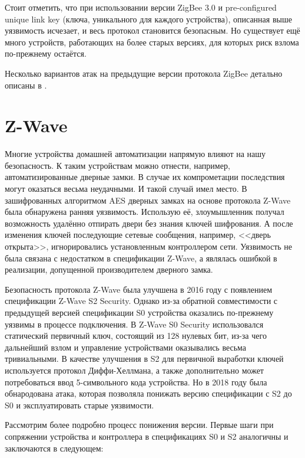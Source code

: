 	Стоит отметить, что при использовании версии ZigBee 3.0 и pre-configured unique link key (ключа,
	уникального для каждого устройства), описанная выше уязвимость исчезает, и весь протокол
	становится безопасным. Но существует ещё много устройств, работающих на более старых версиях,
	для которых риск взлома по-прежнему остаётся.
	
	Несколько вариантов атак на предыдущие версии протокола ZigBee детально описаны в 
	\cite{zigbee-attacks}.


	\section{Z-Wave}
	
	
	Многие устройства домашней автоматизации напрямую влияют на
	нашу безопасность. К таким устройствам можно отнести, например, автоматизированные дверные замки.
	В случае их компрометации последствия могут оказаться весьма неудачными. И такой случай
	имел место. В зашифрованных алгоритмом AES дверных замках на основе протокола Z-Wave была 
	обнаружена ранняя уязвимость. Использую её, злоумышленник получал возможность удалённо отпирать 
	двери без знания ключей шифрования. А после изменения ключей последующие сетевые сообщения, 
	например, <<дверь открыта>>, игнорировались установленным контроллером сети.
	Уязвимость не была связана с недостатком в спецификации Z-Wave, а являлась ошибкой 
	в реализации, допущенной производителем дверного замка.
	
	Безопасность протокола Z-Wave была улучшена в 2016 году с появлением спецификации Z-Wave S2 
	Security. Однако из-за обратной совместимости с предыдущей версией спецификации S0 устройства
	оказались по-прежнему уязвимы в процессе подключения. В Z-Wave S0 Security использовался статический
	первичный ключ, состоящий из 128 нулевых бит, из-за чего дальнейший взлом и управление устройствами 
	оказывались весьма тривиальными. В качестве улучшения в S2 для первичной выработки ключей 
	используется протокол Диффи-Хеллмана, а также дополнительно может потребоваться ввод 5-символьного
	кода устройства. Но в 2018 году была обнародована атака, которая позволяла понижать версию 
	спецификации с S2 до S0 и эксплуатировать старые уязвимости.
	
	
	Рассмотрим более подробно процесс понижения версии. Первые шаги при сопряжении устройства и 
	контроллера в спецификациях S0 и S2 аналогичны и заключаются в следующем:
	
